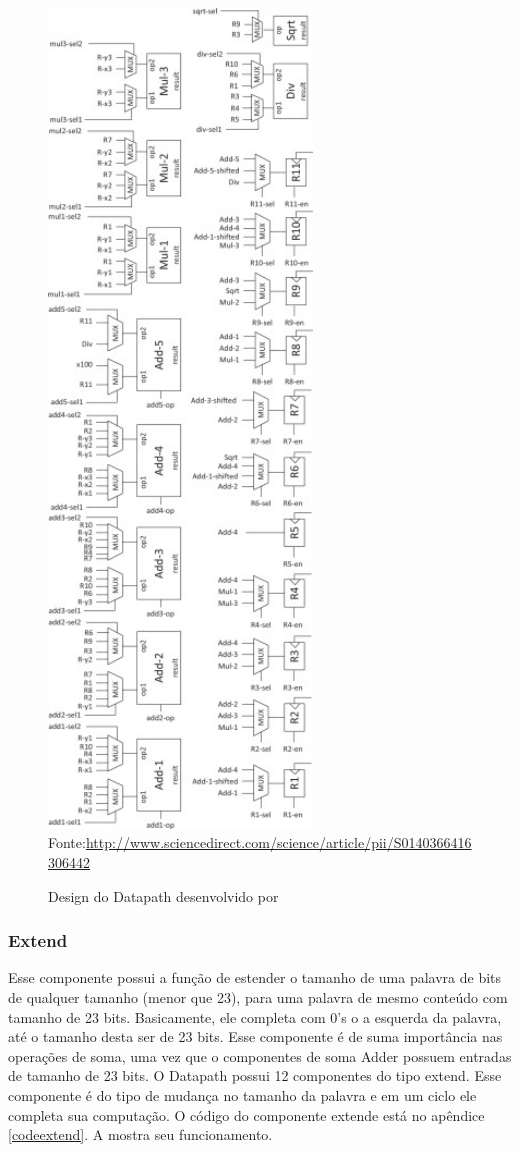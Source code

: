 \begin{figure}[H]
	\centering
	\caption{Design do Datapath desenvolvido por \cite{HOQUE201748}}
	\includegraphics[width=7cm]{figures/dp.jpg}\\
	{Fonte:\url{http://www.sciencedirect.com/science/article/pii/S0140366416306442}}
	\label{data}
\end{figure}



\subsubsection{Extend}
Esse componente possui a função de estender o tamanho de uma palavra de bits de qualquer tamanho (menor que 23), para uma palavra de mesmo conteúdo com tamanho de 23 bits. Basicamente, ele completa com 0's o a esquerda da palavra, até o tamanho desta ser de 23 bits. Esse componente é de suma importância nas operações de soma, uma vez que o componentes de soma Adder  possuem entradas de tamanho de 23 bits. O Datapath possui 12 componentes do tipo extend. Esse componente é do tipo de mudança no tamanho da palavra e em um ciclo ele completa sua computação. O código do componente extende está no apêndice \ref{codeextend}. A  mostra seu funcionamento.


